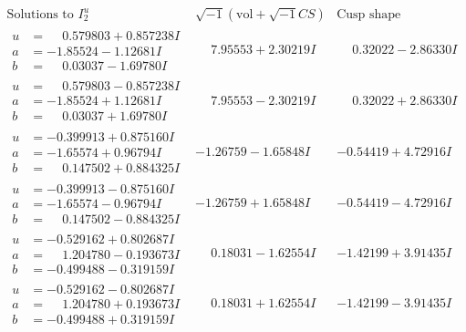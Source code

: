 \documentclass[1p]{elsarticle_modified}
\theoremstyle{definition}
\newcommand{\I}{\sqrt{-1}}
\begin{document}
$$\begin{array}{c|c|c}  
\text{Solutions to }I^u_{2}& \I (\text{vol} + \sqrt{-1}CS) & \text{Cusp shape}\\
 \hline 
\begin{aligned}
u &= \phantom{-}0.579803 + 0.857238 I \\
a &= -1.85524 - 1.12681 I \\
b &= \phantom{-}0.03037 - 1.69780 I\end{aligned}
 & \phantom{-}7.95553 + 2.30219 I & \phantom{-}0.32022 - 2.86330 I \\ \hline\begin{aligned}
u &= \phantom{-}0.579803 - 0.857238 I \\
a &= -1.85524 + 1.12681 I \\
b &= \phantom{-}0.03037 + 1.69780 I\end{aligned}
 & \phantom{-}7.95553 - 2.30219 I & \phantom{-}0.32022 + 2.86330 I \\ \hline\begin{aligned}
u &= -0.399913 + 0.875160 I \\
a &= -1.65574 + 0.96794 I \\
b &= \phantom{-}0.147502 + 0.884325 I\end{aligned}
 & -1.26759 - 1.65848 I & -0.54419 + 4.72916 I \\ \hline\begin{aligned}
u &= -0.399913 - 0.875160 I \\
a &= -1.65574 - 0.96794 I \\
b &= \phantom{-}0.147502 - 0.884325 I\end{aligned}
 & -1.26759 + 1.65848 I & -0.54419 - 4.72916 I \\ \hline\begin{aligned}
u &= -0.529162 + 0.802687 I \\
a &= \phantom{-}1.204780 - 0.193673 I \\
b &= -0.499488 - 0.319159 I\end{aligned}
 & \phantom{-}0.18031 - 1.62554 I & -1.42199 + 3.91435 I \\ \hline\begin{aligned}
u &= -0.529162 - 0.802687 I \\
a &= \phantom{-}1.204780 + 0.193673 I \\
b &= -0.499488 + 0.319159 I\end{aligned}
 & \phantom{-}0.18031 + 1.62554 I & -1.42199 - 3.91435 I \\ \hline\begin{aligned}

\end{aligned}
\end{array}$$
\end{document}
